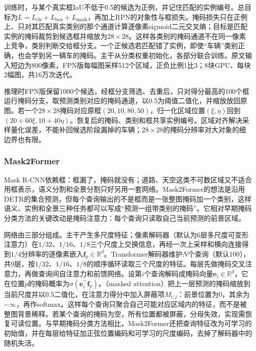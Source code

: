 训练时，与某个真实框IoU不低于0.5的候选为正例，并记住匹配的实例编号。总目标为$L=L_{\mathrm{cls}}+L_{\mathrm{box}}+L_{\mathrm{mask}}$，再加上RPN的对象性与框损失。掩码损失只在正例上、只对其匹配真实类别的那个通道计算逐像素sigmoid二元交叉熵；目标是匹配实例的掩码裁剪到候选框并缩放为$28\times28$。这样各类别的掩码通道不在同一像素上竞争，类别判断交给框分支。一个正候选若匹配错了实例，即使“车辆”类别正确，也会学到另一辆车的掩码。主干从分类权重初始化，各部分联合训练。原文输入短边为800像素，FPN版每幅图采样512个区域，正负比例1比3；8块GPU、每块2幅图，共16万次迭代。

推理时FPN版保留1000个候选，经框分支筛选、去重后，只对得分最高的100个框运行掩码分支，取预测类别对应的掩码通道，以0.5为阈值二值化，并缩放放回原图。若一个$28\times28$掩码对应原框$(20,10,80,50)$，归一化区域位置$(\xi,\eta)$回到$(20+60\xi,10+40\eta)$。恢复后的掩码、类别和框共享实例编号。区域对齐解决采样量化误差，不能补回候选阶段漏掉的车辆；$28\times28$的掩码分辨率对大对象的细边界也有限。

\subsubsection{Mask2Former}
\label{sec:vision-recognition-mask2former}

Mask R-CNN依赖框：框漏了，掩码就没有；道路、天空这类不可数区域又不适合用框表示，语义分割和全景分割只好另用一套网络。Mask2Former的想法是沿用DETR的集合预测，但每个查询输出的不是框而是一张整图掩码加一个类别，这样语义、实例和全景三种任务都可以写成“预测一组带类别的掩码”。它相对早期掩码分类方法的关键改动是掩码注意力：每个查询只读取自己当前预测的前景区域。

网络由三部分组成。主干产生多尺度特征；像素解码器（默认为6层多尺度可变形注意力）在$1/32$、$1/16$、$1/8$三个尺度上交换信息，再经一次上采样和横向连接得到$1/4$分辨率的逐像素嵌入$\bm{f}_p\in\mathbb{R}^{d}$。Transformer解码器维护$N$个查询（默认100），共9层，按$1/32$、$1/16$、$1/8$的顺序循环读取三个尺度的特征。每层先做掩码交叉注意力，再做查询间自注意力和前馈网络。设第$i$个查询解码成掩码向量$\bm{e}_i\in\mathbb{R}^d$，它在位置$p$的掩码概率为$\sigma(\bm{e}_i^\top\bm{f}_p)$。（masked attention）把上一层预测的掩码缩放到当前尺度并以0.5二值化，在注意力得分中加入屏蔽项$M_{i,j}$：前景位置为0，其余为$-\infty$，再作softmax。这样每个查询只聚合自己可能对应区域内的特征，而不是被整图背景稀释。若某个查询的掩码为空，所有位置都被屏蔽，分母失效，实现需恢复可读位置。与早期掩码分类方法相比，Mask2Former还把查询特征改为可学习的初始值，并在每层给特征加正弦位置编码和可学习的尺度编码，去掉了解码器中的随机失活。

